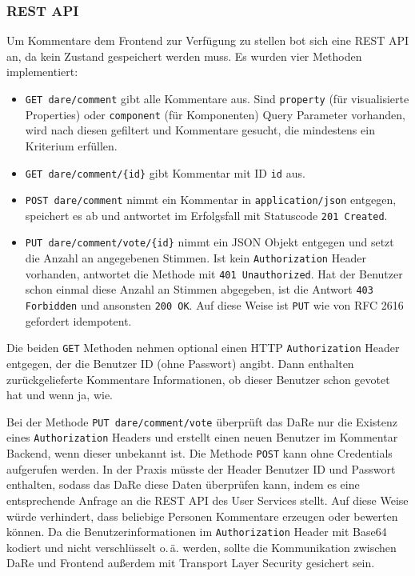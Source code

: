 \documentclass[
	headsepline,
	footsepline,
	fontsize=12pt,
	bibliography=totoc
]{scrbook}
\begin{document}
\subsubsection{REST API}

Um Kommentare dem Frontend zur Verfügung zu stellen bot sich eine REST API an, da kein Zustand gespeichert werden muss. Es wurden vier Methoden implementiert:

\begin{itemize}
	\item \texttt{GET dare/comment} gibt alle Kommentare aus. Sind \texttt{property} (für visualisierte Properties) oder \texttt{component} (für Komponenten) Query Parameter vorhanden, wird nach diesen gefiltert und Kommentare gesucht, die mindestens ein Kriterium erfüllen.
	\item \texttt{GET dare/comment/\{id\}} gibt Kommentar mit ID \texttt{id} aus.
	\item \texttt{POST dare/comment} nimmt ein Kommentar in \texttt{application/json} entgegen, speichert es ab und antwortet im Erfolgsfall mit Statuscode \texttt{201 Created}.
	\item \texttt{PUT dare/comment/vote/\{id\}} nimmt ein JSON Objekt entgegen und setzt die Anzahl an angegebenen Stimmen. Ist kein \texttt{Authorization} Header vorhanden, antwortet die Methode mit \texttt{401 Unauthorized}. Hat der Benutzer schon einmal diese Anzahl an Stimmen abgegeben, ist die Antwort \texttt{403 Forbidden} und ansonsten \texttt{200 OK}. Auf diese Weise ist \texttt{PUT} wie von RFC 2616 \cite{W3C:rfc2616} gefordert idempotent.
\end{itemize}

Die beiden \texttt{GET} Methoden nehmen optional einen HTTP \texttt{Authorization} Header entgegen, der die Benutzer ID (ohne Passwort) angibt. Dann enthalten zurückgelieferte Kommentare Informationen, ob dieser Benutzer schon gevotet hat und wenn ja, wie.

Bei der Methode \texttt{PUT dare/comment/vote} überprüft das DaRe nur die Existenz eines \texttt{Authorization} Headers und erstellt einen neuen Benutzer im Kommentar Backend, wenn dieser unbekannt ist. Die Methode \texttt{POST} kann ohne Credentials aufgerufen werden. In der Praxis müsste der Header Benutzer ID und Passwort enthalten, sodass das DaRe diese Daten überprüfen kann, indem es eine entsprechende Anfrage an die REST API des User Services stellt. Auf diese Weise würde verhindert, dass beliebige Personen Kommentare erzeugen oder bewerten können. Da die Benutzerinformationen im \texttt{Authorization} Header mit Base64 \cite{Josefsson2006} kodiert und nicht verschlüsselt o.\,ä. werden, sollte die Kommunikation zwischen DaRe und Frontend außerdem mit Transport Layer Security gesichert sein.
\end{document}
